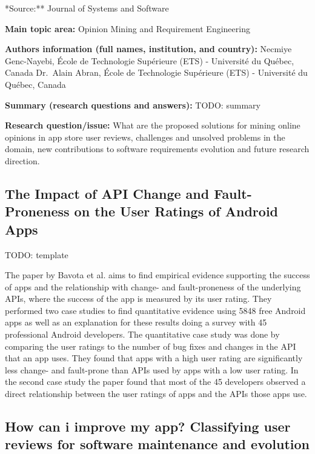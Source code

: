 \documentclass[]{book}
\begin{document}
*Source:** Journal of Systems and Software

\textbf{Main topic area:} Opinion Mining and Requirement Engineering

\textbf{Authors information (full names, institution, and country):}
Necmiye Genc-Nayebi, École de Technologie Supérieure (ETS) - Université
du Québec, Canada Dr.~Alain Abran, École de Technologie Supérieure (ETS)
- Université du Québec, Canada

\textbf{Summary (research questions and answers):} TODO: summary

\textbf{Research question/issue:} What are the proposed solutions for
mining online opinions in app store user reviews, challenges and
unsolved problems in the domain, new contributions to software
requirements evolution and future research direction.

\subsection{The Impact of API Change and Fault-Proneness on the User
Ratings of Android
Apps}\label{the-impact-of-api-change-and-fault-proneness-on-the-user-ratings-of-android-apps}

TODO: template

The paper by Bavota et al. aims to find empirical evidence supporting
the success of apps and the relationship with change- and
fault-proneness of the underlying APIs, where the success of the app is
measured by its user rating. They performed two case studies to find
quantitative evidence using 5848 free Android apps as well as an
explanation for these results doing a survey with 45 professional
Android developers. The quantitative case study was done by comparing
the user ratings to the number of bug fixes and changes in the API that
an app uses. They found that apps with a high user rating are
significantly less change- and fault-prone than APIs used by apps with a
low user rating. In the second case study the paper found that most of
the 45 developers observed a direct relationship between the user
ratings of apps and the APIs those apps use.

\subsection{How can i improve my app? Classifying user reviews for
software maintenance and
evolution}\label{how-can-i-improve-my-app-classifying-user-reviews-for-software-maintenance-and-evolution}
\end{document}
